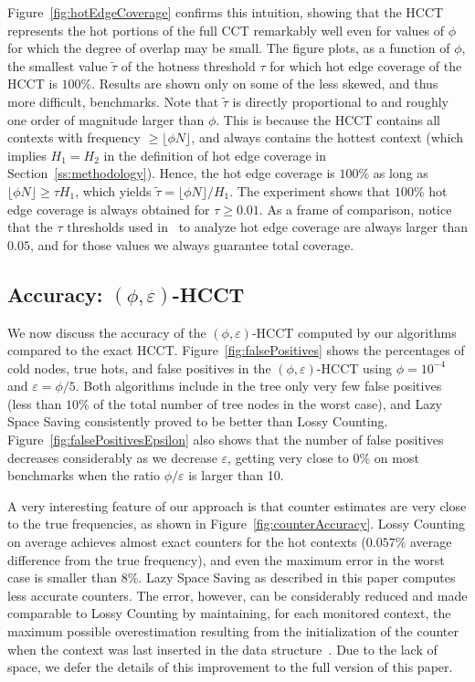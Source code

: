 \documentclass[preprint]{sigplanconf}
\begin{document}
Figure~\ref{fig:hotEdgeCoverage} confirms this intuition, showing that the HCCT represents the hot portions of the full CCT remarkably well even for values of $\phi$ for which the degree of overlap may be small. The figure plots, as a function of $\phi$, the smallest value $\widetilde\tau$ of the hotness threshold $\tau$ for which hot edge coverage of the HCCT is $100\%$. Results are shown only on some of the less skewed, and thus more difficult, benchmarks. Note that $\widetilde\tau$ is directly proportional to and  roughly one order of magnitude larger than $\phi$. This is because the HCCT contains all contexts with frequency $\ge\lfloor\phi N\rfloor$, and always contains the hottest context (which implies $H_1=H_2$ in the definition of hot edge coverage in Section~\ref{ss:methodology}). Hence, the hot edge coverage is $100\%$ as long as $\lfloor\phi N\rfloor\ge\tau H_1$, which yields $\widetilde\tau=\lfloor\phi N\rfloor/H_1$. The experiment shows that $100\%$ hot edge coverage is always obtained for $\tau\ge 0.01$. As a frame of comparison, notice that the $\tau$ thresholds used in~\cite{ZSCC06} to analyze hot edge coverage are always larger than $0.05$, and for those values we always guarantee total coverage.
 
\subsection{Accuracy: $(\phi,\varepsilon)$-HCCT}
\label{ss:accuracy-approx-hcct}

We now discuss the accuracy of the $(\phi,\varepsilon)$-HCCT computed by our algorithms compared to the exact HCCT.
%
Figure~\ref{fig:falsePositives} shows the percentages of cold nodes, true hots, and false positives in the $(\phi,\varepsilon)$-HCCT using $\phi=10^{-4}$ and $\varepsilon=\phi/5$. Both algorithms include in the tree only very few false positives (less than $10\%$ of the total number of tree nodes in the worst case), and Lazy Space Saving consistently proved to be better than Lossy Counting. Figure~\ref{fig:falsePositivesEpsilon} also shows that the number of false positives decreases considerably as we decrease $\varepsilon$, getting very close to $0\%$ on most benchmarks when the ratio $\phi/\varepsilon$ is larger than 10. %

A very interesting feature of our approach is that counter estimates are  very close to the true frequencies, as shown in Figure~\ref{fig:counterAccuracy}. Lossy Counting on average achieves almost exact counters  for the hot contexts ($0.057\%$ average difference from the true frequency), and even the maximum error in the worst case is smaller than $8\%$. Lazy Space Saving as described in this paper computes less accurate counters. The error, however, can be considerably reduced and made comparable to Lossy Counting by maintaining, for each monitored context, the maximum possible overestimation resulting from the initialization of the  counter when the context was last inserted in the data structure~\cite{MAA06}. Due to the lack of space, we defer the details of this improvement to the full version of this paper.
\end{document}

